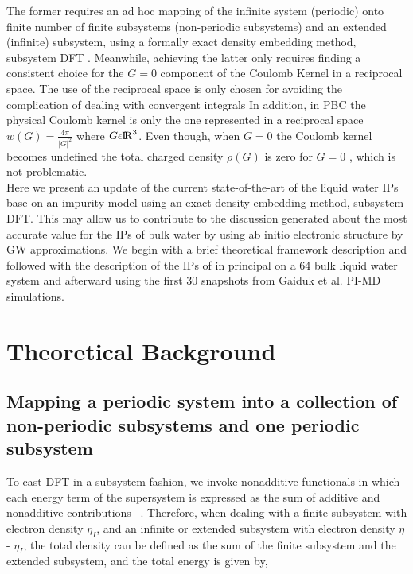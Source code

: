\documentclass[12pt,a4paper]{article}
\begin{document}
The former requires an ad hoc mapping of the infinite system (periodic) onto finite number of finite subsystems (non-periodic subsystems) and an
extended (infinite) subsystem, using a formally exact density embedding method, subsystem DFT \cite{wesolowski2015frozen}. Meanwhile, achieving
the latter only requires finding a consistent choice for the $G = 0$ component of the Coulomb Kernel in a reciprocal space. 
The use of the reciprocal space is only chosen for avoiding the complication of dealing with convergent integrals \cite{martin2004electronic}
In addition, in PBC the physical Coulomb kernel is only the one represented in a reciprocal space $w(G) = \frac {4\pi}{|G|^2}$ where
$G \epsilon {\rm I\!R}^3$. Even though, when $G=0$ the Coulomb kernel becomes undefined the total charged density $\rho (G)$ is zero for $G = 0$
, which is not problematic.\\

Here we present an update of the current state-of-the-art of the liquid water IPs base on an impurity model using an exact density
embedding method, subsystem DFT. This may allow us to contribute to the discussion generated about the most accurate value for the IPs of bulk water
by using ab initio electronic structure \cite{ambrosio2017electronic, gaiduk2018electron} by GW approximations. We begin with a brief theoretical
framework description and followed with the description of the IPs of in principal on a 64 bulk liquid water system and afterward using the first
30 snapshots from Gaiduk et al. PI-MD simulations.

\section{Theoretical Background}

\subsection{Mapping a periodic system into a collection of non-periodic subsystems and one periodic subsystem}

To cast DFT in a subsystem fashion, we invoke nonadditive functionals in which each energy term of the supersystem is expressed as the sum of
additive and nonadditive contributions ~\cite{martyna1999reciprocal}. Therefore, when dealing with a finite subsystem with electron density
$\eta_I$, and an infinite or extended subsystem with electron density $\eta$ - $\eta_I$, the total density can be defined as the sum of the
finite subsystem and the extended subsystem, and the total energy is given by, \\
\end{document}
